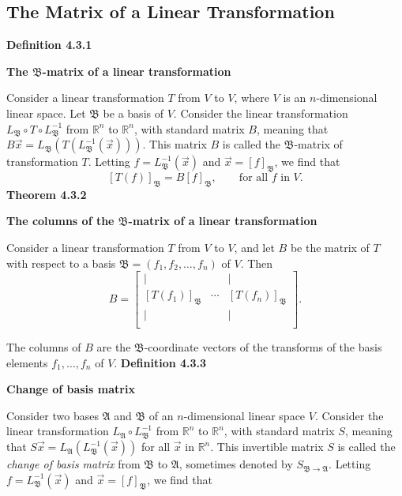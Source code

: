 \subsection{The Matrix of a Linear Transformation}
\textbf{Definition 4.3.1}\\
\par\noindent\textbf{The $\mathfrak{B}$-matrix of a linear transformation}
\par\noindent Consider a linear transformation $T$ from $V$ to $V$, where $V$ is an $n$-dimensional linear space. Let $\mathfrak{B}$ be a basis of $V$. Consider the linear transformation $L_{\mathfrak{B}}\circ{}T\circ{}L_{\mathfrak{B}}^{-1}$ from $\mathbb{R}^{n}$ to $\mathbb{R}^{n}$, with standard matrix $B$, meaning that $B\vec{x}=L_{\mathfrak{B}}(T(L_{\mathfrak{B}}^{-1}(\vec{x})))$. This matrix $B$ is called the $\mathfrak{B}$-matrix of transformation $T$. Letting $f=L_{\mathfrak{B}}^{-1}(\vec{x})$ and $\vec{x}=\left[f\right]_{\mathfrak{B}}$, we find that
\[\left[T(f)\right]_{\mathfrak{B}}=B\left[f\right]_{\mathfrak{B}},\qquad\textrm{for all }f\textrm{ in }V.\]
\textbf{Theorem 4.3.2}\\
\par\noindent\textbf{The columns of the $\mathfrak{B}$-matrix of a linear transformation}
\par\noindent Consider a linear transformation $T$ from $V$ to $V$, and let $B$ be the matrix of $T$ with respect to a basis $\mathfrak{B}=(f_{1},f_{2},\ldots{},f_{n})$ of $V$. Then
\[B=\left[\begin{array}{ccc}|&&|\\{} [T(f_{1})]_{\mathfrak{B}}&\cdots{}&[T(f_{n})]_{\mathfrak{B}}\\ |&&|\\ \end{array}\right].\]
\par\noindent The columns of $B$ are the $\mathfrak{B}$-coordinate vectors of the transforms of the basis elements $f_{1},\ldots{},f_{n}$ of $V$.
\textbf{Definition 4.3.3}\\
\par\noindent\textbf{Change of basis matrix}
\par\noindent Consider two bases $\mathfrak{A}$ and $\mathfrak{B}$ of an $n$-dimensional linear space $V$. Consider the linear transformation $L_{\mathfrak{A}}\circ{}L_{\mathfrak{B}}^{-1}$ from $\mathbb{R}^{n}$ to $\mathbb{R}^{n}$, with standard matrix $S$, meaning that $S\vec{x}=L_{\mathfrak{A}}(L_{\mathfrak{B}}^{-1}(\vec{x}))$ for all $\vec{x}$ in $\mathbb{R}^{n}$. This invertible matrix $S$ is called the \textit{change of basis matrix} from $\mathfrak{B}$ to $\mathfrak{A}$, sometimes denoted by $S_{\mathfrak{B}\rightarrow{}\mathfrak{A}}$. Letting $f=L_{\mathfrak{B}}^{-1}(\vec{x})$ and $\vec{x}=[f]_{\mathfrak{B}}$, we find that
